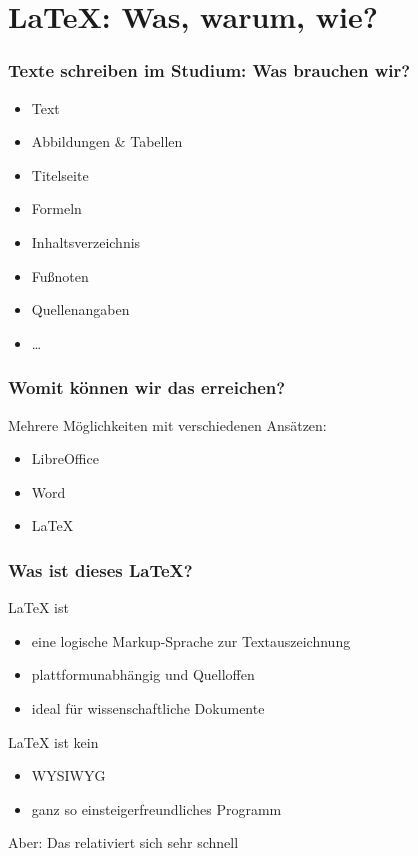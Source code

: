 \section{\LaTeX{}: Was, warum, wie?}

\begin{frame}
    \frametitle{Texte schreiben im Studium: Was brauchen wir?}
    \begin{itemize}
        \item Text\pause
        \item Abbildungen \& Tabellen\pause
        \item Titelseite\pause
        \item Formeln\pause
        \item Inhaltsverzeichnis\pause
        \item Fußnoten\pause
        \item Quellenangaben
        \item \ldots
    \end{itemize}
\end{frame}

\begin{frame}
    \frametitle{Womit können wir das erreichen?}
    \begin{block}{Mehrere Möglichkeiten mit verschiedenen Ansätzen:}
        \pause	    
	    \begin{itemize}
	        \item LibreOffice
	        \item Word\pause
	        \item \LaTeX
	    \end{itemize}
    \end{block}
\end{frame}

\begin{frame}
    \frametitle{Was ist dieses \LaTeX{}?}
    \LaTeX{} ist
    \begin{itemize}
        \item eine logische Markup-Sprache zur Textauszeichnung\pause
        \item plattformunabhängig und Quelloffen\pause
        \item ideal für wissenschaftliche Dokumente
    \end{itemize}
    \bigskip\pause
    
    \LaTeX{} ist kein
    \begin{itemize}
        \item WYSIWYG\pause
        \item ganz so einsteigerfreundliches Programm
    \end{itemize}
    \medskip\pause
    
    Aber: Das relativiert sich sehr schnell
\end{frame}

